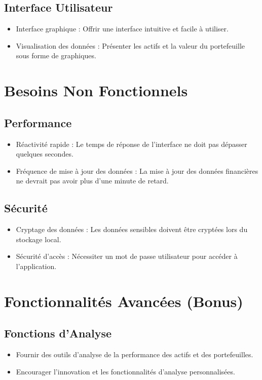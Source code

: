 \documentclass{article}
\begin{document}
\subsection{Interface Utilisateur}
\begin{itemize}
    \item Interface graphique : Offrir une interface intuitive et facile à utiliser.
    \item Visualisation des données : Présenter les actifs et la valeur du portefeuille sous forme de graphiques.
\end{itemize}

\section{Besoins Non Fonctionnels}
\subsection{Performance}
\begin{itemize}
    \item Réactivité rapide : Le temps de réponse de l'interface ne doit pas dépasser quelques secondes.
    \item Fréquence de mise à jour des données : La mise à jour des données financières ne devrait pas avoir plus d'une minute de retard.
\end{itemize}

\subsection{Sécurité}
\begin{itemize}
    \item Cryptage des données : Les données sensibles doivent être cryptées lors du stockage local.
    \item Sécurité d'accès : Nécessiter un mot de passe utilisateur pour accéder à l'application.
\end{itemize}

\section{Fonctionnalités Avancées (Bonus)}
\subsection{Fonctions d'Analyse}
\begin{itemize}
    \item Fournir des outils d'analyse de la performance des actifs et des portefeuilles.
    \item Encourager l'innovation et les fonctionnalités d'analyse personnalisées.
\end{itemize}
\end{document}
